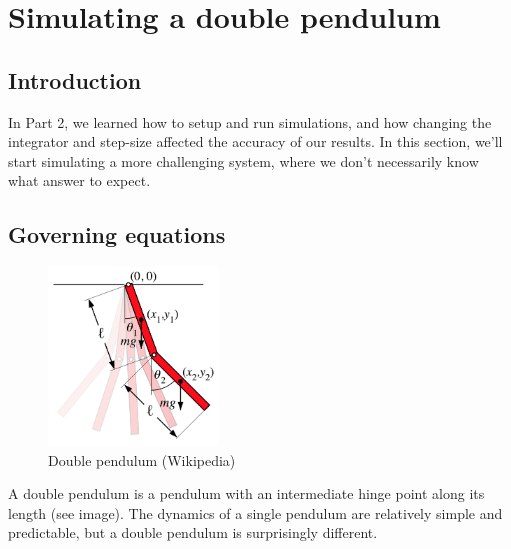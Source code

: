\documentclass[main.tex]{subfiles}
\begin{document}
\chapter{Simulating a double pendulum}

\section{Introduction}

In Part 2, we learned how to setup and run simulations, and how changing the integrator and step-size affected the accuracy of our results.  
In this section, we'll start simulating a more challenging system, where we don't necessarily know what answer to expect.  

%
%
%
%
\section{Governing equations}

\begin{figure}
\centering
\includegraphics[width=0.4\textwidth]{images/pendulum}
\caption{Double pendulum (Wikipedia)}
\end{figure}

A double pendulum is a pendulum with an intermediate hinge point along its length (see image).  
The dynamics of a single pendulum are relatively simple and predictable, but a double pendulum is surprisingly different.
\end{document}
